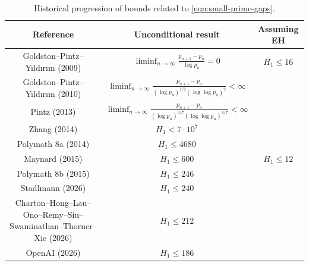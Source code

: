 \begin{table}[ht]
    \caption{Historical progression of bounds related to \eqref{eqn:small-prime-gaps}.}
    \label{small-primegap-table}
    \centering
    \renewcommand{\arraystretch}{2.2}
    \begin{tabular}{|c|c|c|}
    \hline
    Reference & Unconditional result & Assuming EH \\
    \hline
    Goldston--Pintz--Yıldırım (2009) \cite{goldston_primes_2009} & $\displaystyle\liminf_{n\to\infty}\frac{p_{n + 1} - p_n}{\log p_n} = 0$ & $H_1 \le 16$ \\
    \hline
    Goldston--Pintz--Yıldırım (2010) \cite{goldston_primes_2010} & $\displaystyle\liminf_{n\to\infty}\frac{p_{n + 1} - p_n}{(\log p_n)^{1/2}(\log\log p_n)^2} < \infty$ & \\
    \hline
    Pintz (2013) \cite{Pintz_3747} & $\displaystyle\liminf_{n\to\infty}\frac{p_{n + 1} - p_n}{(\log p_n)^{3/7}(\log\log p_n)^{4/7}} < \infty$ & \\
    \hline
    Zhang (2014) \cite{zhang_bounded_2014} & $H_1 < 7\cdot 10^7$ & \\
    \hline
    Polymath 8a (2014) \cite{castryck_new_2014} & $H_1 \le 4680$ & \\
    \hline
    Maynard (2015) \cite{maynard_small_2015} & $H_1 \le 600$ & $H_1 \le 12$ \\
    \hline
    Polymath 8b (2015) \cite{polymath_variants_2014} & $H_1 \le 246$ & \\
    \hline
    Stadlmann (2026) \cite{Stadlmann_240} & $H_1 \le 240$ & \\
    \hline
    Charton--Hong--Lau--Ono--Remy--Siu--Swaminathan--Thorner--Xie (2026) \cite{AxiomMath_212} & $H_1 \le 212$ & \\
    \hline
    OpenAI (2026) \cite{OpenAI_186} & $H_1 \le 186$ & \\
    \hline
    \end{tabular}
    \end{table}

